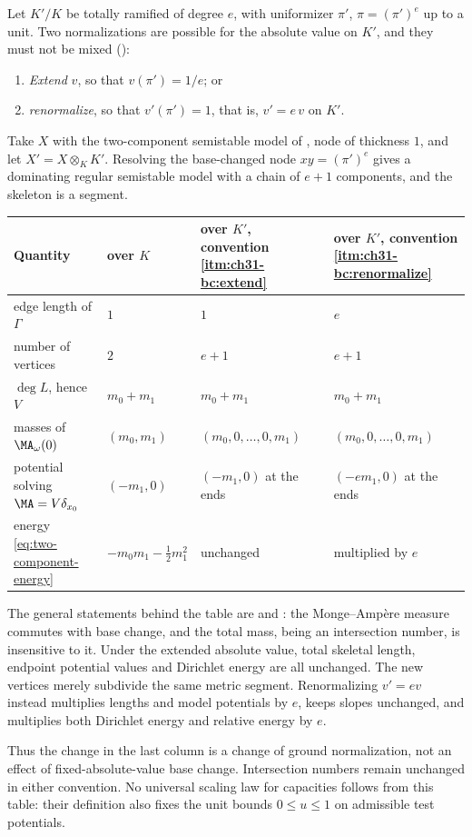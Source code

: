 \begin{example}
\label{ex:ch31-base-change}
Let $K'/K$ be totally ramified of degree $e$, with uniformizer
$\pi'$, $\pi=(\pi')^e$ up to a unit.  Two normalizations are possible
for the absolute value on $K'$, and they must not be mixed
():
\begin{enumerate}
\item\label{itm:ch31-bc:extend} \emph{Extend} $v$, so that
 $v(\pi')=1/e$; or
\item\label{itm:ch31-bc:renormalize} \emph{renormalize}, so that
 $v'(\pi')=1$, that is, $v'=e\,v$ on $K'$.
\end{enumerate}
Take $X$ with the two-component semistable model of
, node of thickness $1$, and let
$X'=X\otimes_KK'$.  Resolving the base-changed node $xy=(\pi')^e$ gives a dominating
regular semistable model with a chain of $e+1$ components, and the skeleton is a segment.
\begin{center}
\small
\begin{tabular}{p{}|p{}|p{}|p{}}
\toprule
\textbf{Quantity}&\textbf{over $K$}
 &\textbf{over $K'$, convention \cref{itm:ch31-bc:extend}}
 &\textbf{over $K'$, convention \cref{itm:ch31-bc:renormalize}}\\
\midrule
edge length of $\Gamma$&$1$&$1$&$e$\\
number of vertices&$2$&$e+1$&$e+1$\\
$\deg L$, hence $V$&$m_0+m_1$&$m_0+m_1$&$m_0+m_1$\\
masses of $\MA_\omega(0)$&$(m_0,m_1)$&$(m_0,0,\ldots,0,m_1)$
 &$(m_0,0,\ldots,0,m_1)$\\
potential solving $\MA=V\delta_{x_0}$&$(-m_1,0)$
 &$(-m_1,0)$ at the ends&$(-em_1,0)$ at the ends\\
energy \eqref{eq:two-component-energy}&$-m_0m_1-\tfrac12m_1^2$
 &unchanged&multiplied by $e$\\
\bottomrule
\end{tabular}
\end{center}
The general statements behind the table are
 and : the
Monge--Amp\`ere measure commutes with base change, and the total mass, being
an intersection number, is insensitive to it.  Under the extended absolute value, total skeletal length, endpoint
potential values and Dirichlet energy are all unchanged.  The new vertices
merely subdivide the same metric segment.  Renormalizing $v'=ev$ instead
multiplies lengths and model potentials by $e$, keeps slopes unchanged,
and multiplies both Dirichlet energy and relative energy by $e$.

Thus the change in the last column is a change of ground normalization,
not an effect of fixed-absolute-value base change.  Intersection numbers
remain unchanged in either convention.  No universal scaling law for
capacities follows from this table: their definition also fixes the unit
bounds $0\leq u\leq1$ on admissible test potentials.
\end{example}

